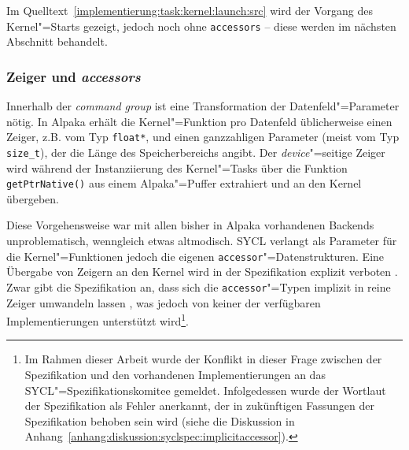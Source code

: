 Im Quelltext~\ref{implementierung:task:kernel:launch:src} wird der Vorgang des
Kernel"=Starts gezeigt, jedoch noch ohne \texttt{accessors} -- diese werden
im nächsten Abschnitt behandelt.

\subsubsection{Zeiger und \textit{accessors}}

Innerhalb der \textit{command group} ist eine Transformation der
Datenfeld"=Parameter nötig. In Alpaka erhält die Kernel"=Funktion pro Datenfeld
üblicherweise einen Zeiger, z.B. vom Typ \texttt{float*}, und einen ganzzahligen
Parameter (meist vom Typ \texttt{size\_t}), der die Länge des Speicherbereichs
angibt. Der \textit{device}"=seitige Zeiger wird während der Instanziierung des
Kernel"=Tasks über die Funktion \texttt{getPtrNative()} aus einem Alpaka"=Puffer
extrahiert und an den Kernel übergeben.

Diese Vorgehensweise war mit allen bisher in Alpaka vorhandenen Backends
unproblematisch, wenngleich etwas altmodisch. SYCL verlangt als Parameter für
die Kernel"=Funktionen jedoch die eigenen \texttt{accessor}"=Datenstrukturen.
Eine Übergabe von Zeigern an den Kernel wird in der Spezifikation explizit
verboten \cite[vgl.][192]{sycl2019}. Zwar gibt die Spezifikation an, dass sich
die \texttt{accessor}"=Typen implizit in reine Zeiger umwandeln lassen
\cite[vgl.][27]{sycl2019}, was jedoch von keiner der verfügbaren
Implementierungen unterstützt wird\footnote{Im Rahmen dieser Arbeit wurde der
Konflikt in dieser Frage zwischen der Spezifikation und den vorhandenen
Implementierungen an das SYCL"=Spezifikationskomitee gemeldet. Infolgedessen
wurde der Wortlaut der Spezifikation als Fehler anerkannt, der in zukünftigen
Fassungen der Spezifikation behoben sein wird (siehe die Diskussion in
Anhang~\ref{anhang:diskussion:syclspec:implicitaccessor}).}.

